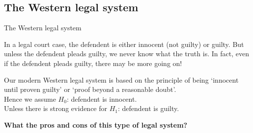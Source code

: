 \documentclass[t,xcolor=pdftex,dvipsnames,table]{beamer}
\begin{document}
\subsection[]{The Western legal system}
\begin{frame}[fragile]{The Western legal system}

In a legal court case, the defendent is either innocent (not guilty) or guilty. But unless the defendent pleads guilty, we never know what the truth is. In fact, even if the defendent pleads guilty, there may be more going on!

\vspace{.5cm}
Our modern Western legal system is based on the principle of being ‘innocent until proven guilty’ or ‘proof beyond a reasonable doubt’.  \\
Hence we assume $H_{0}$: defendent is innocent. \\
Unless there is strong evidence for $H_{1}$: defendent is guilty.

\vspace{.5cm}
{\bf What the pros and cons of this type of legal system?}

\end{frame}
\end{document}
